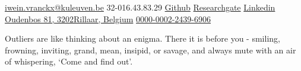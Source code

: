\documentclass[10pt,a4paper]{article}
\begin{document}
\sloppy  %


\nobreakvspace{0.3em}  %

\noindent\href{mailto:ivranckx.at.kuleuven.dot.be}{\faInbox \; iwein.vranckx\mbox{}@\mbox{}kuleuven.be}\sbull
\faWhatsapp \; \textsmaller{+}32-016.43.83.29\sbull
\href{https://github.com/ivranckx}{\faGithub \; Github}\sbull
\href{https://www.researchgate.net/profile/Iwein_Vranckx}{\faPaperclip \; Researchgate}\sbull
\href{http://linkedin.com/in/ivranckx}{\faLinkedin \; Linkedin}
\\
\href{https://www.google.be/maps/place/Oudenbos+81a,+3202+Aarschot/@50.965459,4.8938466,13z/data=!4m5!3m4!1s0x47c143b94205376f:0xa562b96ef1bc6568!8m2!3d50.9657156!4d4.9015994}{\faMapMarker \; Oudenbos  81, 
3202\thinspace Rillaar, Belgium}\sbull%
\href{https://orcid.org/0000-0002-2439-6906}{\textcolor{orcidlogocol}{\aiOrcid} \hspace{0.2mm} 0000-0002-2439-6906}
\spacedhrule{0.9em}{-0.4em}  %
\begin{fquote}
	Outliers are like thinking about an enigma. There it is before you - smiling, frowning, inviting, grand, mean, insipid, or savage, and always mute with an air of whispering, ‘Come and find out'.
\end{fquote}
\end{document}
